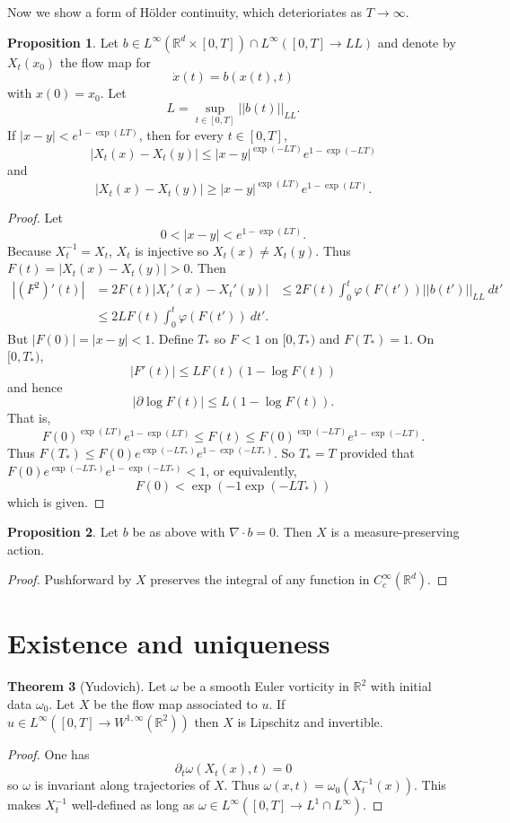 \documentclass[12pt]{book}
\newcommand{\RR}{\mathbb{R}}
\theoremstyle{definition}
\newtheorem{theorem}{Theorem}[chapter]
\newtheorem{proposition}[theorem]{Proposition}
\begin{document}
Now we show a form of H\"older continuity, which deterioriates as $T \to \infty$.

\begin{proposition}
Let $b \in L^\infty(\RR^d \times [0, T]) \cap L^\infty([0, T] \to LL)$ and denote by $X_t(x_0)$ the flow map for
$$\dot x(t) = b(x(t), t)$$
with $x(0) = x_0$.
Let
$$L = \sup_{t \in [0, T]} ||b(t)||_{LL}.$$
If $|x - y| < e^{1 - \exp(LT)}$, then for every $t \in [0, T]$,
$$|X_t(x) - X_t(y)| \leq |x - y|^{\exp(-LT)} e^{1 - \exp(-LT)}$$
and
$$|X_t(x) - X_t(y)| \geq |x - y|^{\exp(LT)} e^{1 - \exp(LT)}.$$
\end{proposition}
\begin{proof}
Let
$$0 < |x - y| < e^{1 - \exp(LT)}.$$
Because $X_t^{-1} = X_t$, $X_t$ is injective so $X_t(x) \neq X_t(y)$.
Thus $F(t) = |X_t(x) - X_t(y)| > 0$.
Then
\begin{align*}
|(F^2)'(t)| &= 2F(t) |X_t'(x) - X_t'(y)|
&\leq 2F(t) \int_0^t \varphi(F(t')) ||b(t')||_{LL} ~dt'\\
&\leq 2L F(t)\int_0^t \varphi(F(t')) ~dt'.
\end{align*}
But $|F(0)| = |x - y| < 1$.
Define $T_*$ so $F < 1$ on $[0, T_*)$ and $F(T_*) = 1$.
On $[0, T_*)$,
$$|F'(t)| \leq LF(t)(1 - \log F(t))$$
and hence
$$|\partial \log F(t)| \leq L(1 - \log F(t)).$$
That is,
$$F(0)^{\exp(LT)}e^{1 - \exp(LT)} \leq F(t) \leq F(0)^{\exp(-LT)} e^{1 - \exp(-LT)}.$$
Thus $F(T_*) \leq F(0) e^{\exp(-LT_*)} e^{1 - \exp(-LT_*)}$.
So $T_* = T$ provided that $F(0) e^{\exp(-LT_*)} e^{1 - \exp(-LT_*)} < 1$, or equivalently,
$$F(0) < \exp(-1 \exp(-LT_*))$$
which is given.
\end{proof}

\begin{proposition}
Let $b$ be as above with $\nabla \cdot b = 0$. Then $X$ is a measure-preserving action.
\end{proposition}
\begin{proof}
Pushforward by $X$ preserves the integral of any function in $C_c^\infty(\RR^d)$.
\end{proof}

\section{Existence and uniqueness}

\begin{theorem}[Yudovich]
Let $\omega$ be a smooth Euler vorticity in $\RR^2$ with initial data $\omega_0$.
Let $X$ be the flow map associated to $u$. If $u \in L^\infty([0, T] \to W^{1, \infty}(\RR^2))$ then $X$ is Lipschitz and invertible.
\end{theorem}
\begin{proof}
One has
$$\partial_t \omega(X_t(x), t) = 0$$
so $\omega$ is invariant along trajectories of $X$.
Thus $\omega(x, t) = \omega_0(X_t^{-1}(x))$.
This makes $X_t^{-1}$ well-defined as long as $\omega \in L^\infty([0, T] \to L^1 \cap L^\infty)$.
\end{proof}
\end{document}

